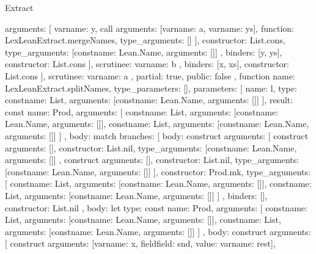 \begin{lexlean}{Extract}
\begin{toolingmodule}
{{{{{{{{                      arguments: [
                        var{name: y},
                        call{
                          arguments: [var{name: a}, var{name: ys}],
                          function: LexLeanExtract.mergeNames,
                          type_arguments: []
                        }
                      ],
                      constructor: List.cons,
                      type_arguments: [const{name: Lean.Name, arguments: []}]
                    }
                  },
                  binders: [y, ys],
                  constructor: List.cons
                }
              ],
              scrutinee: var{name: b}
            },
            binders: [x, xs],
            constructor: List.cons
          }
        ],
        scrutinee: var{name: a}
      },
      partial: true,
      public: false
    },
    function{
      name: LexLeanExtract.splitNames,
      type_parameters: [],
      parameters: [
        {name: l, type: const{name: List, arguments: [const{name: Lean.Name, arguments: []}]}}
      ],
      result: const{
        name: Prod,
        arguments: [
          const{name: List, arguments: [const{name: Lean.Name, arguments: []}]},
          const{name: List, arguments: [const{name: Lean.Name, arguments: []}]}
        ]
      },
      body: match{
        branches: [
          {
            body: construct{
              arguments: [
                construct{
                  arguments: [],
                  constructor: List.nil,
                  type_arguments: [const{name: Lean.Name, arguments: []}]
                },
                construct{
                  arguments: [],
                  constructor: List.nil,
                  type_arguments: [const{name: Lean.Name, arguments: []}]
                }
              ],
              constructor: Prod.mk,
              type_arguments: [
                const{name: List, arguments: [const{name: Lean.Name, arguments: []}]},
                const{name: List, arguments: [const{name: Lean.Name, arguments: []}]}
              ]
            },
            binders: [],
            constructor: List.nil
          },
          {
            body: let{
              type: const{
                name: Prod,
                arguments: [
                  const{name: List, arguments: [const{name: Lean.Name, arguments: []}]},
                  const{name: List, arguments: [const{name: Lean.Name, arguments: []}]}
                ]
              },
              body: construct{
                arguments: [
                  construct{
                    arguments: [var{name: x}, field{field: snd, value: var{name: rest}}],
}}}}}}}
\end{toolingmodule}
\end{lexlean}

